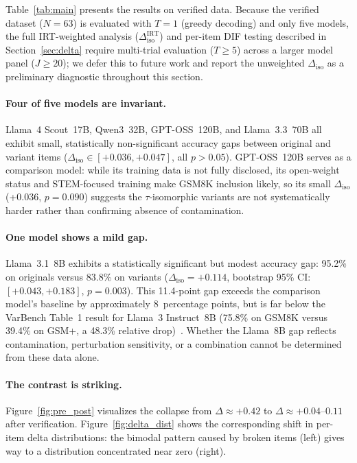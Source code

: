 

Table~\ref{tab:main} presents the results on verified data.
Because the verified dataset ($N=63$) is evaluated with $T=1$
(greedy decoding) and only five models, the full IRT-weighted
analysis ($\Delta^{\text{IRT}}_{\text{iso}}$) and per-item DIF
testing described in Section~\ref{sec:delta} require multi-trial
evaluation ($T \geq 5$) across a larger model panel ($J \geq 20$);
we defer this to future work and report the unweighted
$\Delta_{\text{iso}}$ as a preliminary diagnostic throughout this
section.

\paragraph{Four of five models are invariant.}
Llama~4 Scout~17B, Qwen3~32B, GPT-OSS~120B, and Llama~3.3~70B all exhibit
small, statistically non-significant accuracy gaps between original
and variant items
($\Delta_{\mathrm{iso}} \in [+0.036, +0.047]$, all $p > 0.05$).
GPT-OSS~120B serves as a comparison model: while its training data is
not fully disclosed, its open-weight status and STEM-focused training
make GSM8K inclusion likely, so its small $\Delta_{\mathrm{iso}}$
(+0.036, $p = 0.090$) suggests the $\tau$-isomorphic variants are not
systematically harder rather than confirming absence of contamination.

\paragraph{One model shows a mild gap.}
Llama~3.1~8B exhibits a statistically significant but modest
accuracy gap: 95.2\% on originals versus 83.8\% on variants
($\Delta_{\mathrm{iso}} = +0.114$, bootstrap 95\%
CI: $[+0.043, +0.183]$, $p = 0.003$). This 11.4-point gap exceeds
the comparison model's baseline by approximately 8~percentage points, but is
far below the VarBench Table~1 result for Llama~3 Instruct~8B
(75.8\% on GSM8K versus 39.4\% on GSM+, a 48.3\% relative
drop)~\cite{qian2024varbench}. Whether the Llama~8B gap reflects
contamination, perturbation sensitivity, or a combination cannot be
determined from these data alone.

\paragraph{The contrast is striking.}
Figure~\ref{fig:pre_post} visualizes the collapse from
$\Delta \approx +0.42$ to $\Delta \approx +0.04$--$0.11$ after
verification. Figure~\ref{fig:delta_dist} shows the corresponding
shift in per-item delta distributions: the bimodal pattern caused by
broken items (left) gives way to a distribution concentrated near
zero (right).

